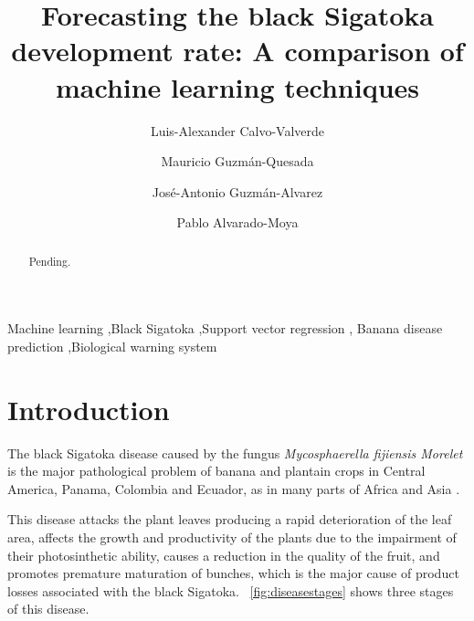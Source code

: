 \documentclass[review]{elsarticle}
\begin{document}
\begin{frontmatter}

\title{Forecasting the black Sigatoka development rate: A comparison of machine learning techniques 
}

\author[afiLuisAlex]{Luis-Alexander Calvo-Valverde}

\author[afiCorbana] {Mauricio Guzmán-Quesada}
\author[afiCorbana]{José-Antonio Guzmán-Alvarez}
\author[afiPablo]{Pablo Alvarado-Moya}

\address[afiLuisAlex]{DOCINADE, Instituto Tecnológico de Costa Rica, 
Computer Research Center, Multidisciplinar program eScience, 
CNCA/CeNAT, Cartago, Costa Rica}

\address[afiCorbana]{Dirección de Investigaciones, Corporación Bananera Nacional S.A., Guápiles, Costa Rica}

\address[afiPablo]{DOCINADE, Instituto Tecnológico de Costa Rica, Cartago, Costa Rica}




\begin{abstract}
Pending.
\end{abstract}

\begin{keyword}
Machine learning \sep Black Sigatoka \sep Support vector regression \sep
Banana disease prediction \sep Biological warning system 
\end{keyword}

\end{frontmatter}

\linenumbers

\section{Introduction}


The black Sigatoka disease caused by the fungus \emph{Mycosphaerella
  fijiensis Morelet} is the major pathological problem of banana and
plantain crops in Central America, Panama, Colombia and Ecuador, as in
many parts of Africa and Asia \citep{MarinVargas1995}.

This disease attacks the plant leaves producing a rapid deterioration
of the leaf area, affects the growth and productivity of the plants
due to the impairment of their photosinthetic ability, causes a
reduction in the quality of the fruit, and promotes premature
maturation  of bunches, which is
the major cause of product losses associated with the black
Sigatoka. \figurename~\ref{fig:diseasestages} shows three stages of
this disease.
\end{document}
